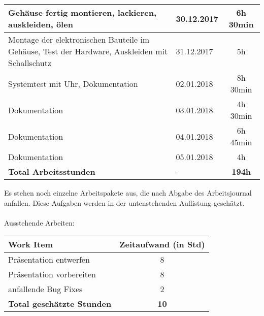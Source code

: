 \begin{longtable}{p{9cm}|p{2cm}|c}
		Gehäuse fertig montieren, lackieren, auskleiden, ölen & 30.12.2017 & 6h 30min  \\ \midrule
		Montage der elektronischen Bauteile im Gehäuse, Test der Hardware, Auskleiden mit Schallschutz & 31.12.2017 & 5h \\ \midrule
		Systemtest mit Uhr, Dokumentation & 02.01.2018 & 8h 30min \\ \midrule
		Dokumentation & 03.01.2018 & 4h 30min \\ \midrule
		Dokumentation & 04.01.2018 & 6h 45min \\ \midrule
		Dokumentation & 05.01.2018 & 4h \\ \midrule
		\textbf{Total Arbeitsstunden}
		&
            -
            &
		\textbf{194h}\\\midrule\bottomrule
	\end{longtable}

\noindent Es stehen noch einzelne Arbeitspakete aus, die nach Abgabe des Arbeitsjournal anfallen. Diese Aufgaben werden in der untenstehenden Auflistung geschätzt.\\
\\
Ausstehende Arbeiten:\\
\begin{tabular}{p{9cm}|c}
    \textbf{Work Item}     & \textbf{Zeitaufwand (in Std)} \\\hline
    Präsentation entwerfen & 8\\
    Präsentation vorbereiten & 8 \\
    anfallende Bug Fixes   & 2\\ \midrule
    \textbf{Total geschätzte Stunden} & \textbf{10}\\ \midrule\bottomrule
\end{tabular}